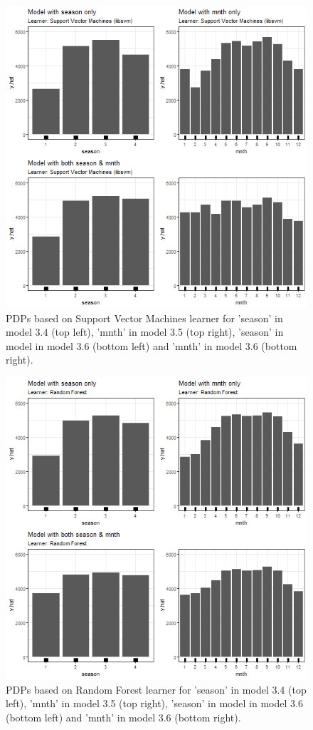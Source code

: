 \documentclass[]{krantz}
\begin{document}
\begin{figure}

{\centering \includegraphics[width=0.8\linewidth]{images/VK_PDP_9_Correlated_categorical_SVM} 

}

\caption{PDPs based on Support Vector Machines learner for 'season' in model 3.4 (top left), 'mnth' in model 3.5 (top right), 'season' in model in model 3.6 (bottom left) and 'mnth' in model 3.6 (bottom right).}\label{fig:Figure09}
\end{figure}

\begin{figure}

{\centering \includegraphics[width=0.8\linewidth]{images/VK_PDP_10_Correlated_categorical_RF} 

}

\caption{PDPs based on Random Forest learner for 'season' in model 3.4 (top left), 'mnth' in model 3.5 (top right), 'season' in model in model 3.6 (bottom left) and 'mnth' in model 3.6 (bottom right).}\label{fig:Figure10}
\end{figure}
\end{document}

